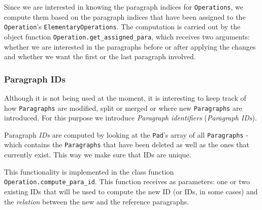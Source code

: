       Since we are interested in knowing the paragraph indices for \texttt{Operations}, we compute them based on the paragraph indices that have been assigned to the \texttt{Operation}'s \texttt{ElementaryOperations}. The computation is carried out by the object function \texttt{Operation.get\_assigned\_para}, which receives two arguments: whether we are interested in the paragraphs before or after applying the changes and whether we want the first or the last paragraph involved.
      

    \subsubsection{Paragraph IDs}
        \label{subs:paraids}
    Although it is not being used at the moment, it is interesting to keep track of how \texttt{Paragraphs} are modified, split or merged or where new \texttt{Paragraphs} are introduced. For this purpose we introduce \textit{Paragraph identifiers} (\textit{Paragraph IDs}).
      
    Paragraph \textit{IDs} are computed by looking at the \texttt{Pad}'s array of all \texttt{Paragraphs} - which contains the \texttt{Paragraphs} that have been deleted as well as the ones that currently exist. This way we make sure that IDs are unique.
      
     This functionality is implemented in the class function \texttt{Operation.compute\_para\_id}. This function receives as parameters: one or two existing IDs that will be used to compute the new ID (or IDs, in some cases) and the \textit{relation} between the new and the reference paragraphs.
      
